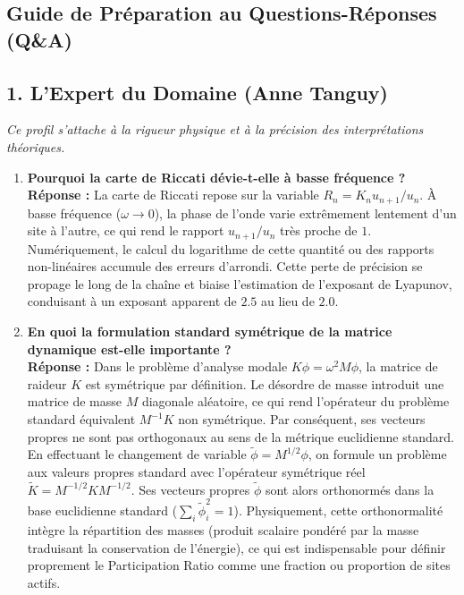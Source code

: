 \documentclass[11pt,a4paper]{article}
\begin{document}
\begin{tcolorbox}[colback=blue!5,colframe=blue!75!black,title=Slide 2 : Table des Matières --- 0:45 à 1:15]
\section{Guide de Préparation au Questions-Réponses (Q\&A)}

\subsection{1. L'Expert du Domaine (Anne Tanguy)}
\textit{Ce profil s'attache à la rigueur physique et à la précision des interprétations théoriques.}

\begin{enumerate}[label=\textbf{Q\arabic* :}]
    \item \textbf{Pourquoi la carte de Riccati dévie-t-elle à basse fréquence ?} \\
    \textbf{Réponse :} \og  La carte de Riccati repose sur la variable $R_n = K_n u_{n+1}/u_n$. À basse fréquence ($\omega \to 0$), la phase de l'onde varie extrêmement lentement d'un site à l'autre, ce qui rend le rapport $u_{n+1}/u_n$ très proche de $1$. Numériquement, le calcul du logarithme de cette quantité ou des rapports non-linéaires accumule des erreurs d'arrondi. Cette perte de précision se propage le long de la chaîne et biaise l'estimation de l'exposant de Lyapunov, conduisant à un exposant apparent de $2.5$ au lieu de $2.0$. \fg{}
    
    \item \textbf{En quoi la formulation standard symétrique de la matrice dynamique est-elle importante ?} \\
    \textbf{Réponse :} \og Dans le problème d'analyse modale $K \phi = \omega^2 M \phi$, la matrice de raideur $K$ est symétrique par définition. Le désordre de masse introduit une matrice de masse $M$ diagonale aléatoire, ce qui rend l'opérateur du problème standard équivalent $M^{-1}K$ non symétrique. Par conséquent, ses vecteurs propres ne sont pas orthogonaux au sens de la métrique euclidienne standard. En effectuant le changement de variable $\tilde{\phi} = M^{1/2} \phi$, on formule un problème aux valeurs propres standard avec l'opérateur symétrique réel $\tilde{K} = M^{-1/2} K M^{-1/2}$. Ses vecteurs propres $\tilde{\phi}$ sont alors orthonormés dans la base euclidienne standard ($\sum_i \tilde{\phi}_i^2 = 1$). Physiquement, cette orthonormalité intègre la répartition des masses (produit scalaire pondéré par la masse traduisant la conservation de l'énergie), ce qui est indispensable pour définir proprement le Participation Ratio comme une fraction ou proportion de sites actifs. \fg{}
\end{enumerate}


\end{tcolorbox}
\end{document}

